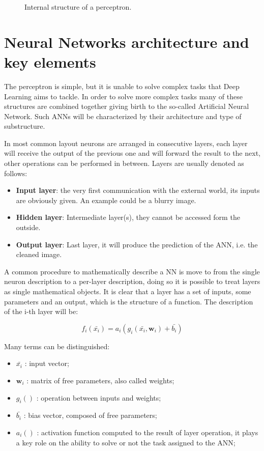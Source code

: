 \documentclass[../../main.tex]{subfiles}
\begin{document}
\begin{figure}[h]
    \centering

\caption{Internal structure of a perceptron.}
    \label{fig:perceptron}
\end{figure}
    
\section{Neural Networks architecture and key elements}
\label{sec:NN_arch}
The perceptron is simple, but it is unable to solve complex tasks that Deep Learning aims to tackle. In order to solve more complex tasks many of these structures are combined together giving birth to the so-called Artificial Neural Network. Such ANNs will be characterized by their architecture and type of substructure.  

In most common layout neurons are arranged in consecutive layers, each layer will receive the output of the previous one and will forward the result to the next, other operations can be performed in between. Layers are usually denoted as follows:
\begin{itemize}
    \item \textbf{Input layer}: the very first communication with the external world, its inputs are obviously given. An example could be a blurry image. 
    \item \textbf{Hidden layer}: Intermediate layer(s), they cannot be accessed form the outside.
    \item \textbf{Output layer}: Last layer, it will produce the prediction of the ANN, i.e. the cleaned image. 
\end{itemize}


A common procedure to mathematically describe a NN is move to from the single neuron description to a per-layer description, doing so it is possible to treat layers as single mathematical objects.  
It is clear that a layer has a set of inputs, some parameters and an output, which is the structure of a function. The description of the i-th layer will be:  

\begin{equation}
    f_i(\bar{x_i}) = a_i\left(g_i(\bar{x_i}, \textbf{w}_i) + \bar{b_i} \right)
\end{equation}

Many terms can be distinguished:
\begin{itemize}
    \item $\bar{x_i}$ : input vector;
    \item $\textbf{w}_i$ : matrix of free parameters, also called weights;
    \item $g_i()$ : operation between inputs and weights;
    \item $\bar{b_i}$ : bias vector, composed of free parameters;
    \item $a_i()$ : activation function computed to the result of layer operation, it plays a key role on the ability to solve or not the task assigned to the ANN;
\end{itemize}
\end{document}
